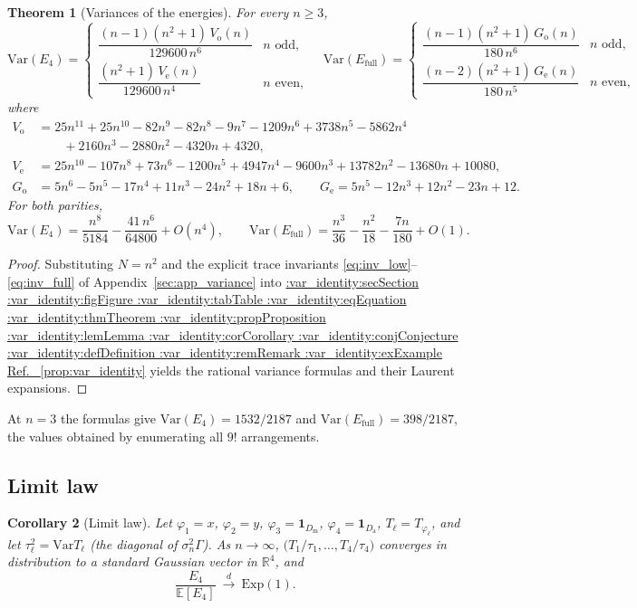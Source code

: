 \documentclass[11pt,a4paper]{article}
\makeatletter
\def\Cref@getprefix#1:#2\relax{#1}
\def\Cref@prefix@sec{sec}
\def\Cref@prefix@fig{fig}
\def\Cref@prefix@tab{tab}
\def\Cref@prefix@eq{eq}
\def\Cref@prefix@thm{thm}
\def\Cref@prefix@prop{prop}
\def\Cref@prefix@lem{lem}
\def\Cref@prefix@cor{cor}
\def\Cref@prefix@conj{conj}
\def\Cref@prefix@def{def}
\def\Cref@prefix@rem{rem}
\def\Cref@prefix@ex{ex}
\def\Cref@type@cap#1{%
  \edef\Cref@tmp{#1}%
  \ifx\Cref@tmp\Cref@prefix@sec Section%
  \else\ifx\Cref@tmp\Cref@prefix@fig Figure%
  \else\ifx\Cref@tmp\Cref@prefix@tab Table%
  \else\ifx\Cref@tmp\Cref@prefix@eq Equation%
  \else\ifx\Cref@tmp\Cref@prefix@thm Theorem%
  \else\ifx\Cref@tmp\Cref@prefix@prop Proposition%
  \else\ifx\Cref@tmp\Cref@prefix@lem Lemma%
  \else\ifx\Cref@tmp\Cref@prefix@cor Corollary%
  \else\ifx\Cref@tmp\Cref@prefix@conj Conjecture%
  \else\ifx\Cref@tmp\Cref@prefix@def Definition%
  \else\ifx\Cref@tmp\Cref@prefix@rem Remark%
  \else\ifx\Cref@tmp\Cref@prefix@ex Example%
  \else Ref.%
  \fi\fi\fi\fi\fi\fi\fi\fi\fi\fi\fi\fi
}
\DeclareRobustCommand{\Cref}[1]{%
  \begingroup
  \edef\Cref@label{#1}%
  \edef\Cref@prefix{\expandafter\Cref@getprefix\Cref@label:\relax}%
  \hyperref[#1]{\Cref@type@cap{\Cref@prefix}~\ref*{#1}}%
  \endgroup
}
\theoremstyle{plain}
\newtheorem{theorem}{Theorem}[section]
\newtheorem{corollary}[theorem]{Corollary}
\theoremstyle{definition}
\theoremstyle{remark}
\newcommand{\R}{\mathbb{R}}
\newcommand{\Var}{\mathrm{Var}}
\newcommand{\Efull}{E_{\mathrm{full}}}
\newcommand{\Efour}{E_4}
\newcommand{\E}{\mathbb{E}}
\makeatother
\begin{document}
\begin{theorem}[Variances of the energies]
\label{thm:var_closed}
For every $n\ge3$,
\[
\Var(\Efour)=\begin{cases}\dfrac{(n-1)(n^2+1)\,V_{\mathrm o}(n)}{129600\,n^{6}}& n\text{ odd},\\[3mm]
\dfrac{(n^2+1)\,V_{\mathrm e}(n)}{129600\,n^{4}}& n\text{ even},\end{cases}\quad
\Var(\Efull)=\begin{cases}\dfrac{(n-1)(n^2+1)\,G_{\mathrm o}(n)}{180\,n^{6}}& n\text{ odd},\\[3mm]
\dfrac{(n-2)(n^2+1)\,G_{\mathrm e}(n)}{180\,n^{5}}& n\text{ even},\end{cases}
\]
where
\begin{align*}
V_{\mathrm o}&=25n^{11}+25n^{10}-82n^9-82n^8-9n^7-1209n^6+3738n^5-5862n^4\\&\qquad+2160n^3-2880n^2-4320n+4320,\\
V_{\mathrm e}&=25n^{10}-107n^8+73n^6-1200n^5+4947n^4-9600n^3+13782n^2-13680n+10080,\\
G_{\mathrm o}&=5n^6-5n^5-17n^4+11n^3-24n^2+18n+6,\qquad
G_{\mathrm e}=5n^5-12n^3+12n^2-23n+12 .
\end{align*}
For both parities,
\[
\Var(\Efour)=\frac{n^8}{5184}-\frac{41\,n^6}{64800}+O(n^4),\qquad
\Var(\Efull)=\frac{n^3}{36}-\frac{n^2}{18}-\frac{7n}{180}+O(1).
\]
\end{theorem}

\begin{proof}
Substituting $N=n^2$ and the explicit trace invariants \eqref{eq:inv_low}--\eqref{eq:inv_full} of Appendix~\ref{sec:app_variance} into \Cref{prop:var_identity} yields the rational variance formulas and their Laurent expansions.
\end{proof}


At $n=3$ the formulas give $\Var(\Efour)=1532/2187$ and $\Var(\Efull)=398/2187$, the values obtained by enumerating all $9!$ arrangements.

\subsection{Limit law}

\begin{corollary}[Limit law]
\label{cor:random_energy_clt}
Let $\varphi_1=x$, $\varphi_2=y$, $\varphi_3=\mathbf 1_{D_{\mathrm m}}$, $\varphi_4=\mathbf 1_{D_{\mathrm a}}$, $T_\ell=T_{\varphi_\ell}$, and let $\tau_\ell^2=\Var T_\ell$ (the diagonal of $\sigma_n^2\Gamma$).
As $n\to\infty$, $\bigl(T_1/\tau_1,\dots,T_4/\tau_4\bigr)$ converges in distribution to a standard Gaussian vector in $\R^4$, and
\begin{equation}
\frac{\Efour}{\E[\Efour]}\ \xrightarrow{\ d\ }\ \mathrm{Exp}(1).
\label{eq:low_limit}
\end{equation}
\end{corollary}
\end{document}
